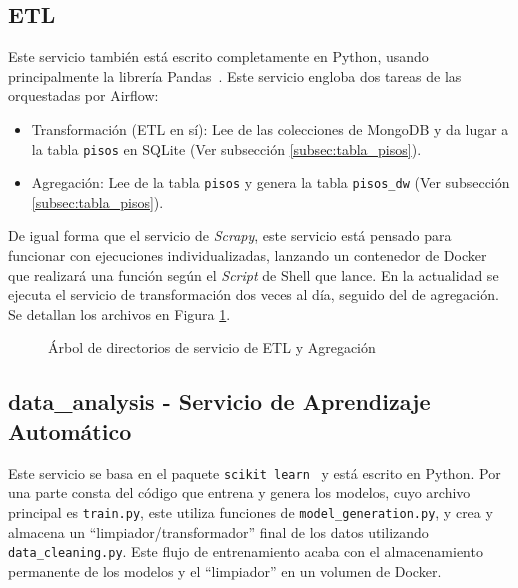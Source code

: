 \clearpage
\subsection{ETL}

Este servicio también está escrito completamente en Python, usando principalmente la librería Pandas~\cite{pandas}. Este servicio engloba dos tareas de las orquestadas por Airflow:

\begin{itemize}
    \item Transformación (ETL en sí): Lee de las colecciones de MongoDB y da lugar a la tabla \texttt{pisos} en SQLite (Ver subsección \ref{subsec:tabla_pisos}).
    \item Agregación: Lee de la tabla \texttt{pisos} y genera la tabla \texttt{pisos\_dw} (Ver subsección \ref{subsec:tabla_pisos}).
\end{itemize}

De igual forma que el servicio de \textit{Scrapy}, este servicio está pensado para funcionar con ejecuciones individualizadas, lanzando un contenedor de Docker que realizará una función según el \textit{Script} de Shell que lance. En la actualidad se ejecuta el servicio de transformación dos veces al día, seguido del de agregación. Se detallan los archivos en Figura \ref{fig:dirtree_ETL}.


\begin{figure}
	\caption{Árbol de directorios de servicio de ETL y Agregación}
	\label{fig:dirtree_ETL}
\end{figure}

\clearpage
\subsection{data\_analysis - Servicio de Aprendizaje Automático}

Este servicio se basa en el paquete \texttt{scikit learn}~\cite{scikit-learn} y está escrito en Python. Por una parte consta del código que entrena y genera los modelos, cuyo archivo principal es \texttt{train.py}, este utiliza funciones de \texttt{model\_generation.py}, y crea y almacena un ``limpiador/transformador'' final de los datos utilizando \texttt{data\_cleaning.py}. Este flujo de entrenamiento acaba con el almacenamiento permanente de los modelos y el ``limpiador'' en un volumen de Docker.

